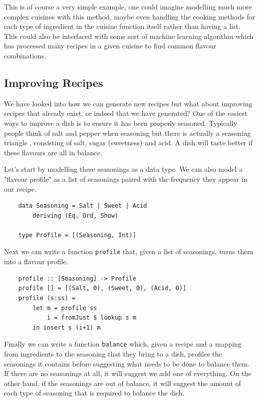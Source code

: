 \documentclass[11pt]{article}
\begin{document}
This is of course a very simple example, one could imagine modelling much more complex
cuisines with this method, maybe even handling the cooking methods for each type of
ingredient in the cuisine function itself rather than having a list. This could also
be interfaced with some sort of machine learning algorithm which has processed
many recipes in a given cuisine to find common flavour combinations.

\subsection{Improving Recipes}

We have looked into how we can generate new recipes but what about improving recipes
that already exist, or indeed that we have generated? One of the easiest ways to
improve a dish is to ensure it has been properly seasoned. Typically people think
of salt and pepper when seasoning but there is actually a seasoning triangle \cite{seasoning},
consisting of salt, sugar (sweetness) and acid. A dish will taste better if these
flavours are all in balance.

\medbreak

Let's start by modelling these seasonings as a data type. We can also model a
"flavour profile" as a list of seasonings paired with the frequency they appear
in our recipe.

\begin{lstlisting}
    data Seasoning = Salt | Sweet | Acid
        deriving (Eq, Ord, Show)

    type Profile = [(Seasoning, Int)]
\end{lstlisting}

Next we can write a function \texttt{profile} that, given a list of seasonings,
turns them into a flavour profile.

\begin{lstlisting}
    profile :: [Seasoning] -> Profile
    profile [] = [(Salt, 0), (Sweet, 0), (Acid, 0)]
    profile (s:ss) =
        let m = profile ss
            i = fromJust $ lookup s m
        in insert s (i+1) m
\end{lstlisting}

Finally we can write a function \texttt{balance} which, given a recipe and
a mapping from ingredients to the seasoning that they bring to a dish,
profiles the seasonings it contains before suggesting what needs to be done
to balance them. If there are no seasonings at all, it will suggest we add
one of everything. On the other hand, if the seasonings are out of balance,
it will suggest the amount of each type of seasoning that is required
to balance the dish.
\end{document}
